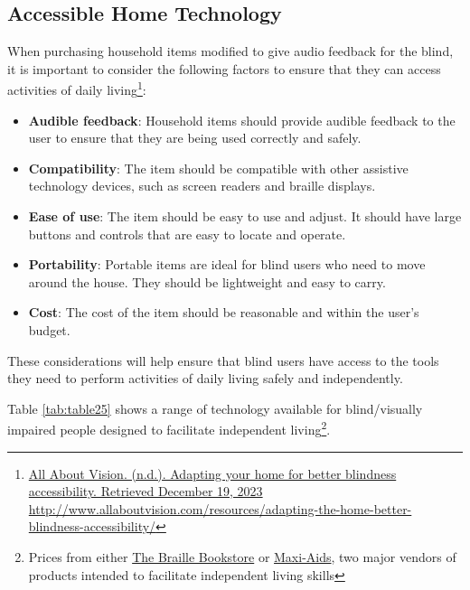 \documentclass[12pt,letterpaper,twoside,openright]{report}
\begin{document}
\hypertarget{ind-living-tools}{}\subsection{Accessible Home Technology}\label{ind-living-tools}
When purchasing household items modified to give audio feedback for the blind, it is important to consider the following factors to ensure that they can access activities of daily living\footnote{\raggedright \href{http://www.allaboutvision.com/resources/adapting-the-home-better-blindness-accessibility/}{All About Vision. (n.d.). Adapting your home for better blindness accessibility. Retrieved December 19, 2023} \url{http://www.allaboutvision.com/resources/adapting-the-home-better-blindness-accessibility/}}:
\begin{itemize}[leftmargin=*]
\item \textbf{Audible feedback}: Household items should provide audible feedback to the user to ensure that they are being used correctly and safely.
\item \textbf{Compatibility}: The item should be compatible with other assistive technology devices, such as screen readers and braille displays.
\item \textbf{Ease of use}: The item should be easy to use and adjust. It should have large buttons and controls that are easy to locate and operate.
\item \textbf{Portability}: Portable items are ideal for blind users who need to move around the house. They should be lightweight and easy to carry.
\item \textbf{Cost}: The cost of the item should be reasonable and within the user’s budget.
\end{itemize}
These considerations will help ensure that blind users have access to the tools they need to perform activities of daily living safely and independently.

Table \ref{tab:table25} shows a range of technology available for blind/visually impaired people designed to facilitate independent living\footnote{\raggedright Prices from either \href{http://www.braillebookstore.com/}{The Braille Bookstore} or \href{http://www.maxiaids.com/}{Maxi-Aids}, two major vendors of products intended to facilitate independent living skills}.
\end{document}
